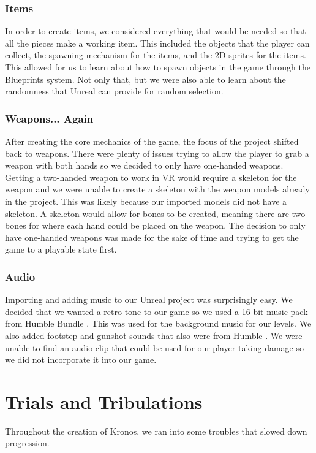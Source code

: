 \documentclass{sigchi}
\begin{document}
\subsubsection*{Items} In order to create items, we considered everything that would be needed so that all the pieces make a working item. This included the objects that the player can collect, the spawning mechanism for the items, and the 2D sprites for the items. This allowed for us to learn about how to spawn objects in the game through the Blueprints system. Not only that, but we were also able to learn about the randomness that Unreal can provide for random selection.

\subsubsection*{Weapons... Again}
After creating the core mechanics of the game, the focus of the project shifted back to weapons. There were plenty of issues trying to allow the player to grab a weapon with both hands so we decided to only have one-handed weapons. Getting a two-handed weapon to work in VR would require a skeleton for the weapon and we were unable to create a skeleton with the weapon models already in the project. This was likely because our imported models did not have a skeleton. A skeleton would allow for bones to be created, meaning there are two bones for where each hand could be placed on the weapon. The decision to only have one-handed weapons was made for the sake of time and trying to get the game to a playable state first.

\subsubsection*{Audio}
Importing and adding music to our Unreal project was surprisingly easy. We decided that we wanted a retro tone to our game so we used a 16-bit music pack from Humble Bundle \cite{humble}. This was used for the background music for our levels. We also added footstep and gunshot sounds that also were from Humble \cite{humble}. We were unable to find an audio clip that could be used for our player taking damage so we did not incorporate it into our game. 

\section{Trials and Tribulations}
Throughout the creation of Kronos, we ran into some troubles that slowed down progression. 
\end{document}
